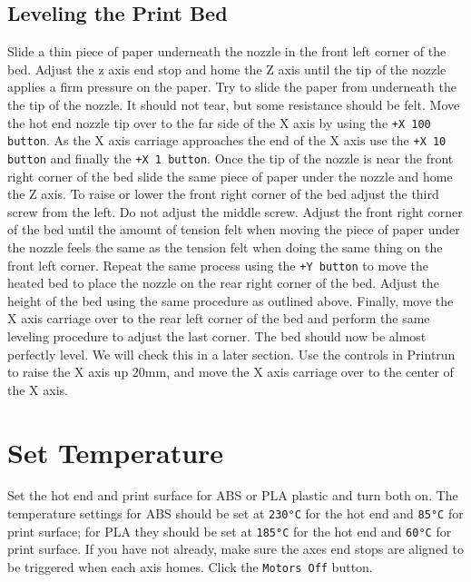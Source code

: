 \subsection{Leveling the Print Bed}
Slide a thin piece of paper underneath the nozzle in the front left corner of the bed. Adjust the z axis end stop and home the Z axis until the tip of the nozzle applies a firm pressure on the paper. Try to slide the paper from underneath the the tip of the nozzle. It should not tear, but some resistance should be felt. Move the hot end nozzle tip over to the far side of the X axis by using the \texttt{+X 100 button}. As the X axis carriage approaches the end of the X axis use the \texttt{+X 10 button} and finally the \texttt{+X 1 button}. Once the tip of the nozzle is near the front right corner of the bed slide the same piece of paper under the nozzle and home the Z axis. To raise or lower the front right corner of the bed adjust the third screw from the left. Do not adjust the middle screw. Adjust the front right corner of the bed until the amount of tension felt when moving the piece of paper under the nozzle feels the same as the tension felt when doing the same thing on the front left corner. Repeat the same process using the \texttt{+Y button} to move the heated bed to place the nozzle on the rear right corner of the bed. Adjust the height of the bed using the same procedure as outlined above. Finally, move the X axis carriage over to the rear left corner of the bed and perform the same leveling procedure to adjust the last corner. The bed should now be almost perfectly level. We will check this in a later section. Use the controls in Printrun to raise the X axis up 20mm, and move the X axis carriage over to the center of the X axis.

\section{Set Temperature}
Set the hot end and print surface for ABS or PLA plastic and turn both on. The temperature settings for ABS should be set at \texttt{230°C} for the hot end and \texttt{85°C} for print surface; for PLA they should be set at \texttt{185°C} for the hot end and \texttt{60°C} for print surface. If you have not already, make sure the axes end stops are aligned to be triggered when each axis homes. Click the \texttt{Motors Off} button.
